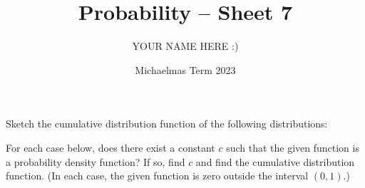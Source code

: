 \documentclass[answers]{exam}
\title{Probability -- Sheet 7}
\author{YOUR NAME HERE :)}
\date{Michaelmas Term 2023}
\begin{document}
\maketitle
\begin{questions}

\question%
Sketch the cumulative distribution function of the following distributions:



\question%
For each case below, does there exist a constant $c$ such that the given function is a probability density function? If so, find $c$ and find the cumulative distribution function. (In each case, the given function is zero outside the interval $(0,1)$.)
\end{questions}
\end{document}
